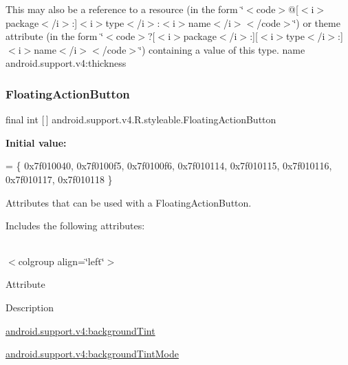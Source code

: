 This may also be a reference to a resource (in the form \char`\"{}$<$code$>$@\mbox{[}$<$i$>$package$<$/i$>$\+:\mbox{]}$<$i$>$type$<$/i$>$\+:$<$i$>$name$<$/i$>$$<$/code$>$\char`\"{}) or theme attribute (in the form \char`\"{}$<$code$>$?\mbox{[}$<$i$>$package$<$/i$>$\+:\mbox{]}\mbox{[}$<$i$>$type$<$/i$>$\+:\mbox{]}$<$i$>$name$<$/i$>$$<$/code$>$\char`\"{}) containing a value of this type.  name android.\+support.\+v4\+:thickness \mbox{\label{classandroid_1_1support_1_1v4_1_1R_1_1styleable_ad3363bb32f8e5e0dde36b5e32146816b}} 
\subsubsection{\texorpdfstring{Floating\+Action\+Button}{FloatingActionButton}}
{\footnotesize\ttfamily final int \mbox{[}$\,$\mbox{]} android.\+support.\+v4.\+R.\+styleable.\+Floating\+Action\+Button\hspace{0.3cm}{\ttfamily [static]}}

{\bfseries Initial value\+:}
\begin{DoxyCode}
= \{
            0x7f010040, 0x7f0100f5, 0x7f0100f6, 0x7f010114,
            0x7f010115, 0x7f010116, 0x7f010117, 0x7f010118
        \}
\end{DoxyCode}
Attributes that can be used with a Floating\+Action\+Button. 

Includes the following attributes\+:

\tabulinesep=1mm
\begin{longtabu} spread 0pt [c]{*{0}{|X[-1]}|}
\hline
\end{longtabu}
$<$colgroup align=\char`\"{}left\char`\"{}$>$ 

Attribute

Description 

{\ttfamily \hyperlink{classandroid_1_1support_1_1v4_1_1R_1_1styleable_aeb7656d79670be2f4574c32fe5d56324}{android.\+support.\+v4\+:background\+Tint}}

{\ttfamily \hyperlink{classandroid_1_1support_1_1v4_1_1R_1_1styleable_aee1803929827518ab119257a16d76e6d}{android.\+support.\+v4\+:background\+Tint\+Mode}}

